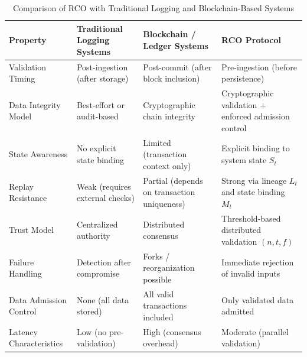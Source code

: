 \begin{table}[htbp]
\footnotesize
\centering
\caption{Comparison of RCO with Traditional Logging and Blockchain-Based Systems}
\label{tab:comparison}

\renewcommand{\arraystretch}{1.25}

\begin{tabularx}{\textwidth}{|p{3.2cm}|X|X|X|}
\hline
\textbf{Property} & \textbf{Traditional Logging Systems} & \textbf{Blockchain / Ledger Systems} & \textbf{RCO Protocol} \\
\hline

Validation Timing & Post-ingestion (after storage) & Post-commit (after block inclusion) & Pre-ingestion (before persistence) \\

\hline

Data Integrity Model & Best-effort or audit-based & Cryptographic chain integrity & Cryptographic validation + enforced admission control \\

\hline

State Awareness & No explicit state binding & Limited (transaction context only) & Explicit binding to system state $S_t$ \\

\hline

Replay Resistance & Weak (requires external checks) & Partial (depends on transaction uniqueness) & Strong via lineage $L_t$ and state binding $M_t$ \\

\hline

Trust Model & Centralized authority & Distributed consensus & Threshold-based distributed validation $(n, t, f)$ \\

\hline

Failure Handling & Detection after compromise & Forks / reorganization possible & Immediate rejection of invalid inputs \\

\hline

Data Admission Control & None (all data stored) & All valid transactions included & Only validated data admitted \\

\hline

Latency Characteristics & Low (no pre-validation) & High (consensus overhead) & Moderate (parallel validation) \\


\end{tabularx}
\end{table}

